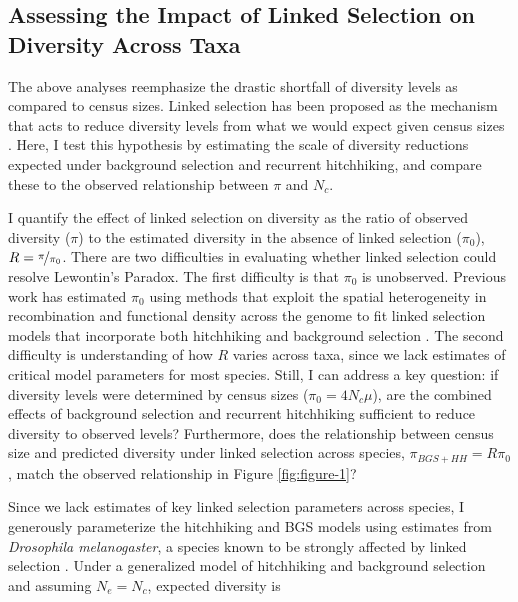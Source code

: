 \documentclass[11pt]{article}
\begin{document}
\subsection*{Assessing the Impact of Linked Selection on Diversity Across Taxa}

The above analyses reemphasize the drastic shortfall of diversity levels as
compared to census sizes. Linked selection has been proposed as the mechanism
that acts to reduce diversity levels from what we would expect given census
sizes \parencite{Maynard_Smith1974-zr,Gillespie2000-mh,Corbett-Detig2015-gt}.
Here, I test this hypothesis by estimating the scale of diversity reductions
expected under background selection and recurrent hitchhiking, and compare
these to the observed relationship between $\pi$ and $N_c$. 

I quantify the effect of linked selection on diversity as the ratio of observed
diversity ($\pi$) to the estimated diversity in the absence of linked selection
($\pi_0$), $R = \nicefrac{\pi}{\pi_0}$. There are two difficulties in
evaluating whether linked selection could resolve Lewontin's Paradox. The first
difficulty is that $\pi_0$ is unobserved. Previous work has estimated $\pi_0$
using methods that exploit the spatial heterogeneity in recombination and
functional density across the genome to fit linked selection models that
incorporate both hitchhiking and background selection
\parencite{Elyashiv2016-vt,Corbett-Detig2015-gt}. The second difficulty is
understanding of how $R$ varies across taxa, since we lack estimates of
critical model parameters for most species. Still, I can address a key
question: if diversity levels were determined by census sizes ($\pi_0 = 4N_c
\mu$), are the combined effects of background selection and recurrent
hitchhiking sufficient to reduce diversity to observed levels? Furthermore,
does the relationship between census size and predicted diversity under linked
selection across species, $\pi_{BGS+HH} = R \pi_0$, match the observed
relationship in Figure \ref{fig:figure-1}? 

Since we lack estimates of key linked selection parameters across species, I
generously parameterize the hitchhiking and BGS models using estimates from
\emph{Drosophila melanogaster}, a species known to be strongly affected by
linked selection \parencite{Sella2009-nx}. Under a generalized model of
hitchhiking and background selection \parencite{Elyashiv2016-vt,Coop2012-cd}
and assuming $N_e = N_c$, expected diversity is
\end{document}
